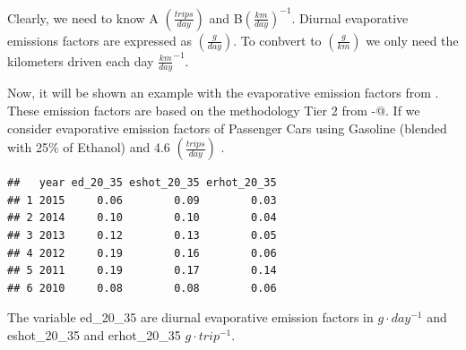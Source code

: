 \documentclass[12pt,graybox,envcountchap,sectrefs]{krantz}
\theoremstyle{definition}
\theoremstyle{definition}
\theoremstyle{definition}
\theoremstyle{remark}
\begin{document}
Clearly, we need to know A \((\frac{trips}{day})\) and
B\((\frac{km}{day})^{-1}\). Diurnal evaporative emissions factors are
expressed as \((\frac{g}{day})\). To conbvert to \((\frac{g}{km})\) we
only need the kilometers driven each day \(\frac{km}{day}^{-1}\).

Now, it will be shown an example with the evaporative emission factors
from \citet{CETESB2015}. These emission factors are based on the
methodology Tier 2 from -@\citet{MelliosNtziachristos2016}. If we
consider evaporative emission factors of Passenger Cars using Gasoline
(blended with 25\% of Ethanol) \citep{CETESB2015} and 4.6
\((\frac{trips}{day})\) \citep{ibarrathesis}.

\begin{verbatim}
##   year ed_20_35 eshot_20_35 erhot_20_35
## 1 2015     0.06        0.09        0.03
## 2 2014     0.10        0.10        0.04
## 3 2013     0.12        0.13        0.05
## 4 2012     0.19        0.16        0.06
## 5 2011     0.19        0.17        0.14
## 6 2010     0.08        0.08        0.06
\end{verbatim}

The variable ed\_20\_35 are diurnal evaporative emission factors in
\(g \cdot day^{-1}\) and eshot\_20\_35 and erhot\_20\_35
\(g \cdot trip^{-1}\).
\end{document}
